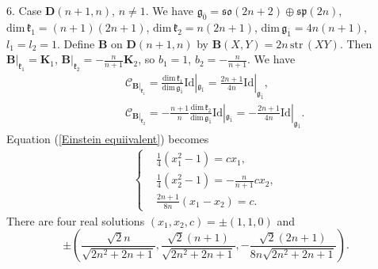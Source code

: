 \documentclass[reqno]{amsart}
\theoremstyle{definition}
\begin{document}
6. Case $\mathbf{D}(n+1,n)$, $n\neq 1.$
We have
$\mathfrak{g}_{\bar{0}}=\mathfrak{so}(2n+2)\oplus \mathfrak{sp}(2n)$, $\mathrm{dim}\,\mathfrak{k}_{1}=(n+1)(2n+1)$, $\mathrm{dim}\,\mathfrak{k}_{2}=n(2n+1)$, $\mathrm{dim}\,\mathfrak{g}_{\bar{1}}=4n(n+1)$, $l_{1}=l_{2}=1$.
 Define $\mathbf{B}$  on $\mathbf{D}(n+1,n)$  by $\mathbf{B}(X,Y)=2n\,\mathrm{str}\,(XY)$. Then $\mathbf{B}|_{\mathfrak{k}_{1}}=\mathbf{K}_{1}$,  $\mathbf{B}|_{\mathfrak{k}_{2}}=-\frac{n}{n+1}\mathbf{K}_{2}$, so $b_{1}=1$, $b_{2}=-\frac{n}{n+1}$. We have
\begin{eqnarray*}
&&\mathcal{C}_{\mathbf{B}|_{\mathfrak{k}_{1}}}=\frac{\mathrm{dim}\,\mathfrak{k}_{1}}{\mathrm{dim}\,\mathfrak{g}_{\bar{1}}}\mathrm{Id}|_{\mathfrak{g}_{\bar{1}}}
                                            =\frac{2n+1}{4n}\mathrm{Id}|_{\mathfrak{g}_{\bar{1}}},\\
&&\mathcal{C}_{\mathbf{B}|_{\mathfrak{k}_{2}}}=-\frac{n+1}{n}\frac{\mathrm{dim}\,\mathfrak{k}_{2}}{\mathrm{dim}\,\mathfrak{g}_{\bar{1}}}\mathrm{Id}|_{\mathfrak{g}_{\bar{1}}}
                                              =-\frac{2n+1}{4n}\mathrm{Id}|_{\mathfrak{g}_{\bar{1}}}.
\end{eqnarray*}
Equation (\ref{Einstein equiivalent}) becomes
\begin{eqnarray*}
\left\{
\begin{aligned}
&\frac{1}{4}(x_{1}^{2}-1)=c x_{1},\\
&\frac{1}{4}(x_{2}^{2}-1)=-\frac{n}{n+1}c x_{2},\\
&\frac{2n+1}{8n}(x_{1}-x_{2})=c.
\end{aligned}\right.
\end{eqnarray*}
There are four real solutions $(x_{1},x_{2},c)=\pm(1,1,0)$ and
$$\pm\left(
                  \frac{\sqrt{2}n}{\sqrt{2n^{2}+2n+1}},
                   \frac{\sqrt{2}(n+1)}{\sqrt{2n^{2}+2n+1}},
                    -\frac{\sqrt{2}(2n+1)}{8n\sqrt{2n^{2}+2n+1}}
                  \right).$$
\end{document}
